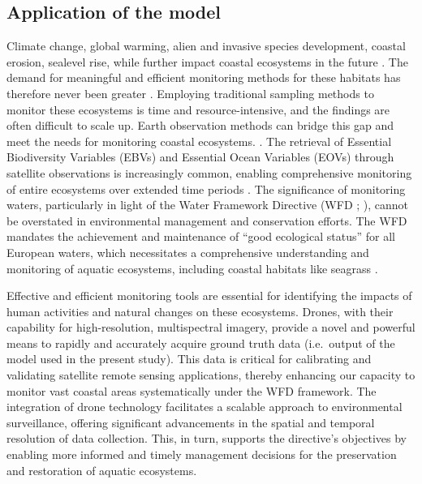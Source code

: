 \documentclass[
  number]{elsarticle}
\begin{document}
\subsection{Application of the model}\label{application-of-the-model}

Climate change, global warming, alien and invasive species development,
coastal erosion, sealevel rise, while further impact coastal ecosystems
in the future \citetext{\citealp{SCHIBALSKI2022101414}; \citealp[
]{holon2018predictive}; \citealp{marquet2024global}}. The demand for
meaningful and efficient monitoring methods for these habitats has
therefore never been greater \citetext{\citealp[
]{muller2018satellite}; \citealp[
]{villalobos2023remote}; \citealp{oiry2021using}}. Employing traditional
sampling methods to monitor these ecosystems is time and
resource-intensive, and the findings are often difficult to scale up.
Earth observation methods can bridge this gap and meet the needs for
monitoring coastal ecosystems. \citep{papathanasopoulou2019satellite}.
The retrieval of Essential Biodiversity Variables (EBVs) and Essential
Ocean Variables (EOVs) through satellite observations is increasingly
common, enabling comprehensive monitoring of entire ecosystems over
extended time periods \citetext{\citealp[
]{ratnarajah2023monitoring}; \citealp{ZOFFOLI2020112020}}. The
significance of monitoring waters, particularly in light of the Water
Framework Directive (WFD ; \citep{WFD2000}), cannot be overstated in
environmental management and conservation efforts. The WFD mandates the
achievement and maintenance of ``good ecological status'' for all
European waters, which necessitates a comprehensive understanding and
monitoring of aquatic ecosystems, including coastal habitats like
seagrass \citetext{\citealp[ ]{foden2007angiosperms}; \citealp[
]{nordlund2024one}; \citealp{Zoffoli2021}}.

Effective and efficient monitoring tools are essential for identifying
the impacts of human activities and natural changes on these ecosystems.
Drones, with their capability for high-resolution, multispectral
imagery, provide a novel and powerful means to rapidly and accurately
acquire ground truth data (i.e.~output of the model used in the present
study). This data is critical for calibrating and validating satellite
remote sensing applications, thereby enhancing our capacity to monitor
vast coastal areas systematically under the WFD framework. The
integration of drone technology facilitates a scalable approach to
environmental surveillance, offering significant advancements in the
spatial and temporal resolution of data collection. This, in turn,
supports the directive's objectives by enabling more informed and timely
management decisions for the preservation and restoration of aquatic
ecosystems.
\end{document}
